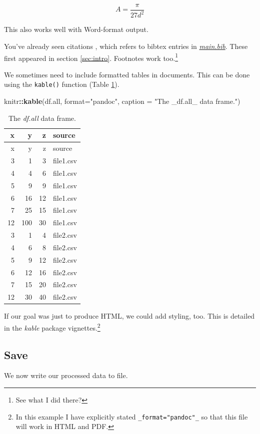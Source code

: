 \documentclass[11pt,]{article}
\newenvironment{Shaded}{\begin{snugshade}}{\end{snugshade}}
\newcommand{\DataTypeTok}[1]{\textcolor[rgb]{0.13,0.29,0.53}{#1}}
\newcommand{\KeywordTok}[1]{\textcolor[rgb]{0.13,0.29,0.53}{\textbf{#1}}}
\newcommand{\NormalTok}[1]{#1}
\newcommand{\OperatorTok}[1]{\textcolor[rgb]{0.81,0.36,0.00}{\textbf{#1}}}
\newcommand{\StringTok}[1]{\textcolor[rgb]{0.31,0.60,0.02}{#1}}
\let\rmarkdownfootnote\footnote%
\def\footnote{\protect\rmarkdownfootnote}
\begin{document}
\begin{equation}
A=\frac{\pi}{27d^2}
\label{eq:eq}
\end{equation}

This also works well with Word-format output.

You've already seen citations \citep{R-base}, which refers to bibtex entries in \href{main.bib}{\emph{main.bib}}. These first appeared in section \ref{sec:intro}. Footnotes work too.\footnote{See what I did there?}

We sometimes need to include formatted tables in documents. This can be done using the \texttt{kable()} function (Table \ref{tab:dfall}).

\begin{Shaded}
\begin{Highlighting}[]
\NormalTok{knitr}\OperatorTok{::}\KeywordTok{kable}\NormalTok{(df.all,}
  \DataTypeTok{format=}\StringTok{"pandoc"}\NormalTok{,}
  \DataTypeTok{caption =} \StringTok{"The _df.all_ data frame."}\NormalTok{)}
\end{Highlighting}
\end{Shaded}

\begin{longtable}[]{@{}rrrl@{}}
\caption{\label{tab:dfall}The \emph{df.all} data frame.}\tabularnewline
\toprule
x & y & z & source\tabularnewline
\midrule
\endfirsthead
\toprule
x & y & z & source\tabularnewline
\midrule
\endhead
3 & 1 & 3 & file1.csv\tabularnewline
4 & 4 & 6 & file1.csv\tabularnewline
5 & 9 & 9 & file1.csv\tabularnewline
6 & 16 & 12 & file1.csv\tabularnewline
7 & 25 & 15 & file1.csv\tabularnewline
12 & 100 & 30 & file1.csv\tabularnewline
3 & 1 & 4 & file2.csv\tabularnewline
4 & 6 & 8 & file2.csv\tabularnewline
5 & 9 & 12 & file2.csv\tabularnewline
6 & 12 & 16 & file2.csv\tabularnewline
7 & 15 & 20 & file2.csv\tabularnewline
12 & 30 & 40 & file2.csv\tabularnewline
\bottomrule
\end{longtable}

If our goal was just to produce HTML, we could add styling, too. This is detailed in the \emph{kable} package vignettes.\footnote{In this example I have explicitly stated \texttt{\_format="pandoc"\_} so that this file will work in HTML and PDF.}

\hypertarget{implementSave}{%
\subsection{Save}\label{implementSave}}

We now write our processed data to file.
\end{document}
